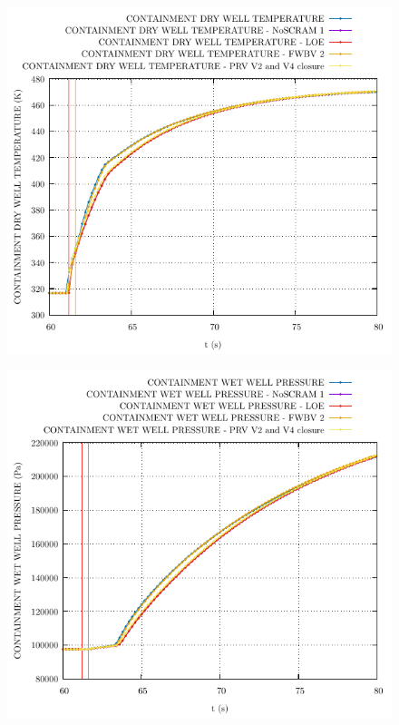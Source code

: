 \documentclass{article}
\begin{document}
\begin{multicols}{2}
\begin{figure}[H]
\end{figure}
\begin{figure}[H]
\centering
\includegraphics[width=\linewidth]{./graphs/CONTAINMENT DRY WELL TEMPERATURE.pdf}
\end{figure}
\begin{figure}[H]
\centering
\includegraphics[width=\linewidth]{./graphs/CONTAINMENT WET WELL PRESSURE.pdf}

\end{figure}
\end{multicols}
\end{document}
